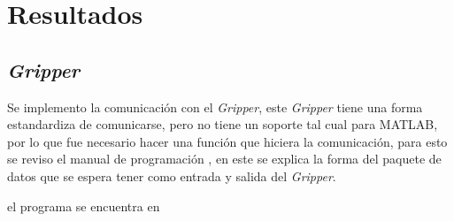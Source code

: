 \chapter{Resultados}





















\section{\textit{Gripper}}
Se implemento la comunicación con el \textit{Gripper}, este \textit{Gripper} tiene una forma estandardiza de comunicarse, pero no tiene un soporte tal cual para MATLAB, por lo que fue necesario hacer una función que hiciera la comunicación, para esto se reviso el manual de programación \cite{wsgmanual}, en este se explica la forma del paquete de datos que se espera tener como entrada y salida del \textit{Gripper}.

el programa se encuentra en 


























